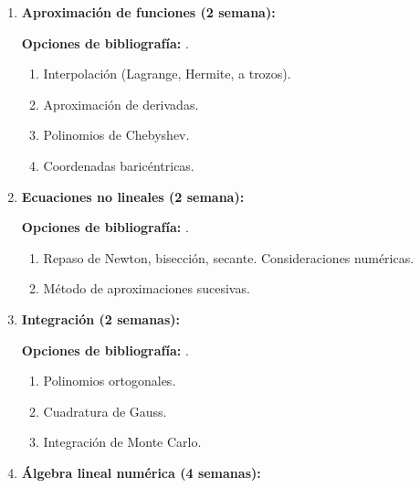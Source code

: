\begin{refsection}
\begin{enumerate}
\begin{enumerate}
	\item Representación de números en aritmética de punto flotante.
	\item Errores por redondeo.
	\item Ejemplos de precisión y estabilidad.
\end{enumerate}

\item \textbf{Aproximación de funciones (2 semana):}

\textbf{Opciones de bibliografía:} \cite{Suli2003,Trefethen2}.

\begin{enumerate}
	\item Interpolación (Lagrange, Hermite, a trozos). 
	\item Aproximación de derivadas.
	\item Polinomios de Chebyshev.
	\item Coordenadas baricéntricas.
\end{enumerate}
	
	
\item \textbf{Ecuaciones no lineales (2 semana):}

\textbf{Opciones de bibliografía:} \cite{Suli2003}.
	
\begin{enumerate}
    \item Repaso de Newton, bisección, secante. Consideraciones numéricas.
	\item Método de aproximaciones sucesivas.
\end{enumerate}

\item \textbf{Integración (2 semanas):}

\textbf{Opciones de bibliografía:} \cite{Suli2003}.

\begin{enumerate}
	\item Polinomios ortogonales.
	\item Cuadratura de Gauss.
	\item Integración de Monte Carlo.
\end{enumerate}
	
\item \textbf{Álgebra lineal numérica (4 semanas):}


\end{enumerate}
\end{refsection}
